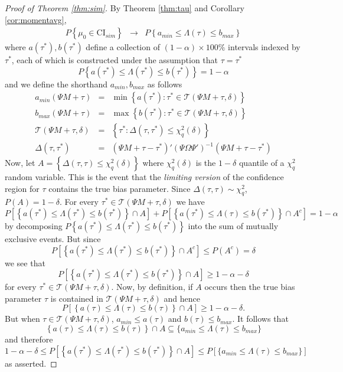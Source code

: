 \begin{proof}[Proof of Theorem \ref{thm:sim}]
By Theorem \ref{thm:tau} and Corollary \ref{cor:momentavg},
\begin{eqnarray*}
	P\left\{\mu_0 \in \mbox{CI}_{sim} \right\} %
	&\rightarrow& P \left\{ a_{min} \leq \Lambda(\tau) \leq b_{max}\right\}
\end{eqnarray*}
where $a(\tau^*), b(\tau^*)$ define a collection of $(1-\alpha)\times 100\%$ intervals indexed by $\tau^*$, each of which is constructed under the assumption that $\tau = \tau^*$
$$P\left\{a(\tau^*) \leq \Lambda(\tau^*) \leq b(\tau^*) \right\} = 1-\alpha $$
and we define the shorthand $a_{min}, b_{max}$ as follows
	\begin{eqnarray*}
	a_{min}(\Psi M + \tau)&=&\min \left\{a(\tau^*)\colon \tau^* \in \mathscr{T}(\Psi M + \tau,\delta) \right\}\\
	b_{max}(\Psi M + \tau)&=&\max \left\{b(\tau^*)\colon \tau^* \in \mathscr{T}(\Psi M + \tau,\delta) \right\}\\
	\mathscr{T}(\Psi M + \tau,\delta) &=& \left\{\tau^* \colon  \Delta(\tau, \tau^*) \leq \chi^2_q(\delta) \right\}\\
	\Delta(\tau,\tau^*) &=&  (\Psi M + \tau - \tau^*)' (\Psi\Omega\Psi')^{-1} \left(\Psi M + \tau - \tau^*\right)
	\end{eqnarray*}
Now, let $A = \left\{ \Delta(\tau, \tau) \leq \chi^2_q(\delta) \right\}$ where $\chi^2_q(\delta)$ is the $1- \delta$ quantile of a $\chi^2_q$ random variable. 
This is the event that the \emph{limiting version} of the confidence region for $\tau$ contains the true bias parameter. 
Since $\Delta(\tau, \tau)\sim\chi^2_q$, $P(A) = 1 - \delta$. For every $\tau^*\in \mathscr{T}(\Psi M + \tau,\delta)$ we have
$$P\left[\left\{a(\tau^*) \leq \Lambda(\tau^*) \leq b(\tau^*)  \right\}\cap A \right] + P\left[\left\{a(\tau^*) \leq \Lambda(\tau) \leq b(\tau^*)  \right\}\cap A^c \right] = 1-\alpha$$
by decomposing $P\left\{a(\tau^*) \leq \Lambda(\tau^*) \leq b(\tau^*) \right\} $ into the sum of mutually exclusive events. 
But since
$$P\left[\left\{a(\tau^*) \leq \Lambda(\tau^*) \leq b(\tau^*)  \right\}\cap A^c \right] \leq P(A^c) = \delta$$
we see that
$$P\left[\left\{a(\tau^*) \leq \Lambda(\tau^*) \leq b(\tau^*)  \right\}\cap A \right]  
\geq 1-\alpha-\delta$$
for every $\tau^* \in \mathscr{T}(\Psi M + \tau,\delta)$. 
Now, by definition, if $A$ occurs then the true bias parameter $\tau$ is contained in $\mathscr{T}(\Psi M + \tau,\delta)$ and hence 
$$P\left[\left\{a(\tau) \leq \Lambda(\tau) \leq b(\tau)  \right\}\cap A \right]  
\geq 1-\alpha-\delta.$$
But when $\tau \in \mathscr{T}(\Psi M + \tau,\delta)$, $a_{min} \leq a(\tau)$ and $b(\tau) \leq b_{max}$. 
It follows that
	$$\left\{a(\tau) \leq \Lambda(\tau) \leq b(\tau)  \right\}\cap A \subseteq \{a_{min} \leq \Lambda(\tau) \leq b_{max}\}$$
and therefore
	$$1 -\alpha - \delta \leq P\left[\left\{a(\tau^*) \leq \Lambda(\tau^*) \leq b(\tau^*)  \right\}\cap A \right] \leq P\left[ \{a_{min} \leq \Lambda(\tau) \leq b_{max}\}\right]$$
as asserted.
\end{proof}
